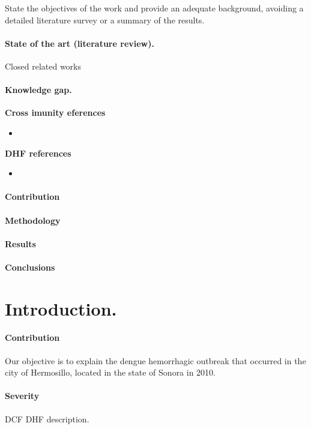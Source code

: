 State the objectives of the work and provide an adequate
background, avoiding a detailed literature survey or a
summary of the results.
\paragraph{State of the art (literature review).}
Closed related works


\paragraph{Knowledge gap.}
    \textbf{Cross imunity eferences}
    \begin{itemize}
        \item
            \cite{Garba2010}
    \end{itemize}
    \textbf{DHF references}
    \begin{itemize}
        \item
            \cite{Nuraini2007}
    \end{itemize}
\paragraph{Contribution}
\paragraph{Methodology}
\paragraph{Results}
\paragraph{Conclusions}


\section{Introduction.}\label{intro}
\paragraph{Contribution}
Our objective is to explain the dengue hemorrhagic outbreak that
occurred in the city of Hermosillo, located in the state of Sonora in 2010.
\paragraph{Severity}
\ac{DCF}
\ac{DHF} description.
